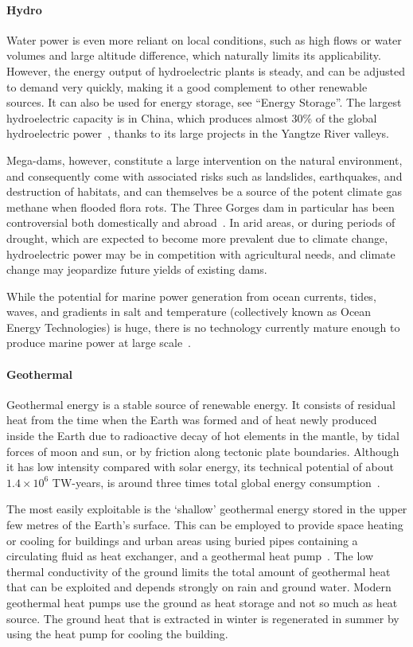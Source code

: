 \documentclass[../SustainableHEP.tex]{subfiles}
\begin{document}
\paragraph{Hydro}

Water power is even more reliant on local conditions, such as high flows or water volumes and large altitude difference, which naturally limits its applicability.  However, the energy output of hydroelectric plants is steady, and can be adjusted to demand very quickly, making it a good complement to other renewable sources. It can also be used for energy storage, see ``Energy Storage''. The largest hydroelectric capacity is in China, which produces almost 30\% of the global hydroelectric power~\cite{IHA2021}, thanks to its large projects in the Yangtze River valleys.

Mega-dams, however, constitute a large intervention on the natural environment, and consequently come with associated risks such as landslides, earthquakes, and destruction of habitats, and can themselves be a source of the potent climate gas methane when flooded flora rots. The Three Gorges dam in particular has been controversial both domestically and abroad~\cite{ThreeGorges}. In arid areas, or during periods of drought, which are expected to become more prevalent due to climate change, hydroelectric power may be in competition with agricultural needs, and climate change may jeopardize future yields of existing dams.

While the potential for marine power generation from ocean currents, tides, waves, and gradients in salt and temperature (collectively known as Ocean Energy Technologies) is huge, there is no technology currently mature enough to produce marine power at large scale~\cite{OET}.

\paragraph{Geothermal}

Geothermal energy is a stable source of renewable energy. It consists of residual heat from the time when the Earth was formed and of heat newly produced inside the Earth due to radioactive decay of hot elements in the mantle, by tidal forces of moon and sun, or by friction along tectonic plate boundaries. Although it has low intensity compared with solar energy, its technical potential of about $1.4 \times10^6$ TW-years, is around three times total global energy consumption~\cite{Britannica}.

The most easily exploitable is the `shallow' geothermal energy stored in the upper few metres of the Earth's surface.  This can be employed to provide space heating or cooling for buildings and urban areas using buried pipes containing a circulating fluid as heat exchanger, and a geothermal heat pump~\cite{Narsilio2018}. The low thermal conductivity of the ground limits the total amount of geothermal heat that can be exploited and depends strongly on rain and ground water. Modern geothermal heat pumps use the ground as heat storage and not so much as heat source. The ground heat that is extracted in winter is regenerated in summer by using the heat pump for cooling the building.  
\end{document}
